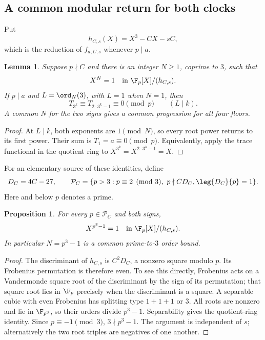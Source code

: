 \documentclass[11pt,a4paper]{article}
\newtheorem{lemma}[theorem]{Lemma}\newtheorem{proposition}[theorem]{Proposition}
\theoremstyle{definition}\newtheorem{definition}[theorem]{Definition}
\theoremstyle{remark}\newtheorem{remark}[theorem]{Remark}
\begin{document}
\subsection{A common modular return for both clocks}

Put
\[
 h_{C,s}(X)=X^3-CX-sC,
\]
which is the reduction of $f_{a,C,s}$ whenever $p\mid a$.

\begin{lemma}\label{R08:lem:return}
Suppose $p\nmid C$ and there is an integer $N\ge1$, coprime to $3$,
such that
\[
                    X^N=1\quad\text{in }\F_p[X]/(h_{C,s}).
\]
If $p\mid a$ and $L=\ord_N(3)$, with $L=1$ when $N=1$, then
\[
                     T_{3^k}\equiv T_{2\cdot3^k-1}\equiv0\pmod p
                             \qquad(L\mid k).
\]
A common $N$ for the two signs gives a common progression for all four floors.
\end{lemma}
\begin{proof}
At $L\mid k$, both exponents are $1\pmod N$, so every root power
returns to its first power. Their sum is $T_1=a\equiv0\pmod p$.
Equivalently, apply the trace functional in the quotient ring to
$X^{3^k}=X^{2\cdot3^k-1}=X$.
\end{proof}

For an elementary source of these identities, define
\begin{equation}\label{R08:eq:goodprime}
 D_C=4C-27,\qquad
 \mathcal P_C=\{p>3:p\equiv2\pmod3,\ p\nmid C D_C,
                                      \leg{D_C}{p}=1\}.
\end{equation}
Here and below $p$ denotes a prime.

\begin{proposition}\label{R08:prop:elementaryreturn}
For every $p\in\mathcal P_C$ and both signs,
\[
                         X^{p^3-1}=1\quad\text{in }\F_p[X]/(h_{C,s}).
\]
In particular $N=p^3-1$ is a common prime-to-$3$ order bound.
\end{proposition}
\begin{proof}
The discriminant of $h_{C,s}$ is $C^2D_C$, a nonzero square modulo $p$.
Its Frobenius permutation is therefore even. To see this directly,
Frobenius acts on a Vandermonde square root of the discriminant by the
sign of its permutation; that square root lies in $\F_p$ precisely
when the discriminant is a square. A separable cubic with even
Frobenius has splitting type $1+1+1$ or $3$.
All roots are nonzero and lie in $\F_{p^3}$, so their orders divide
$p^3-1$. Separability gives the quotient-ring identity.
Since $p\equiv-1\pmod3$, $3\nmid p^3-1$.
The argument is independent of $s$; alternatively the two root triples
are negatives of one another.
\end{proof}
\end{document}

